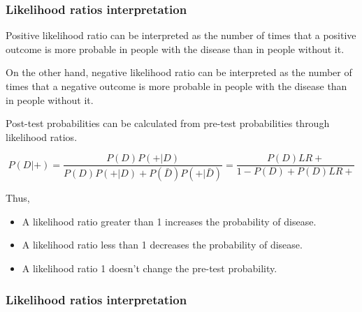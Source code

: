 \begin{frame}
\frametitle{Likelihood ratios interpretation}
Positive likelihood ratio can be interpreted as the number of times that a positive outcome is more probable in people
with the disease than in people without it. 

On the other hand, negative likelihood ratio can be interpreted as the number of times that a negative outcome is more
probable in people with the disease than in people without it. 

Post-test probabilities can be calculated from pre-test probabilities through likelihood ratios.

\[
P(D|+) = \frac{P(D)P(+|D)}{P(D)P(+|D)+P(\bar D)P(+|\bar D)} = \frac{P(D)LR+}{1-P(D)+P(D)LR+}
\]

Thus, 
\begin{itemize}
\item A likelihood ratio greater than 1 increases the probability of disease.
\item A likelihood ratio less than 1 decreases the probability of disease.
\item A likelihood ratio 1 doesn't change the pre-test probability. 
\end{itemize}
\end{frame}


\begin{frame}
\frametitle{Likelihood ratios interpretation}
\begin{center}
\end{center}
\end{frame}
